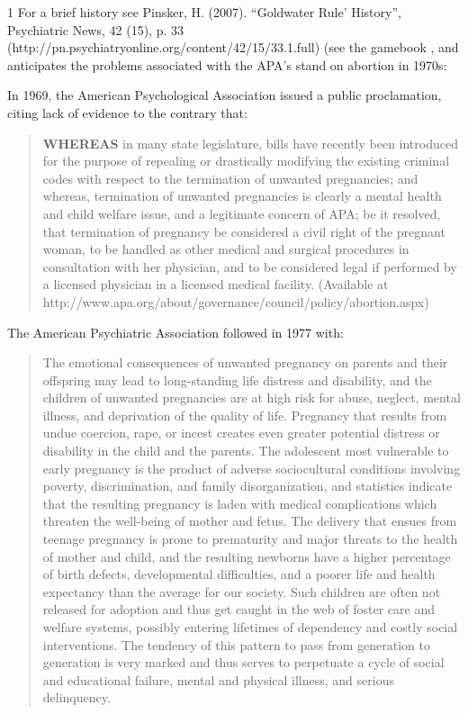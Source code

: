\begin{refsection}
{1 For a brief history see Pinsker, H. (2007). “Goldwater Rule' History”, Psychiatric News, 42 (15), p. 33 (http:\slash \slash pn.psychiatryonline.org\slash content\slash 42\slash 15\slash 33.1.full)} (see the gamebook , and anticipates the problems associated with the APA’s stand on abortion in 1970s:

In 1969, the American Psychological Association issued a public proclamation, citing lack of evidence to the contrary that:

\begin{quote}

\textbf{WHEREAS} in many state legislature, bills have recently been introduced for the purpose of repealing or drastically modifying the existing criminal codes with respect to the termination of unwanted pregnancies; and whereas, termination of unwanted pregnancies is clearly a mental health and child welfare issue, and a legitimate concern of APA; be it resolved, that termination of pregnancy be considered a civil right of the pregnant woman, to be handled as other medical and surgical procedures in consultation with her physician, and to be considered legal if performed by a licensed physician in a licensed medical facility.⁠ (Available at http:\slash \slash www.apa.org\slash about\slash governance\slash council\slash policy\slash abortion.aspx)
\end{quote}

The American Psychiatric Association followed in 1977 with:

\begin{quote}

The emotional consequences of unwanted pregnancy on parents and their offspring may lead to long-standing life distress and disability, and the children of unwanted pregnancies are at high risk for abuse, neglect, mental illness, and deprivation of the quality of life. Pregnancy that results from undue coercion, rape, or incest creates even greater potential distress or disability in the child and the parents. The adolescent most vulnerable to early pregnancy is the product of adverse sociocultural conditions involving poverty, discrimination, and family disorganization, and statistics indicate that the resulting pregnancy is laden with medical complications which threaten the well-being of mother and fetus. The delivery that ensues from teenage pregnancy is prone to prematurity and major threats to the health of mother and child, and the resulting newborns have a higher percentage of birth defects, developmental difficulties, and a poorer life and health expectancy than the average for our society. Such children are often not released for adoption and thus get caught in the web of foster care and welfare systems, possibly entering lifetimes of dependency and costly social interventions. The tendency of this pattern to pass from generation to generation is very marked and thus serves to perpetuate a cycle of social and educational failure, mental and physical illness, and serious delinquency.


\end{quote}
\end{refsection}
